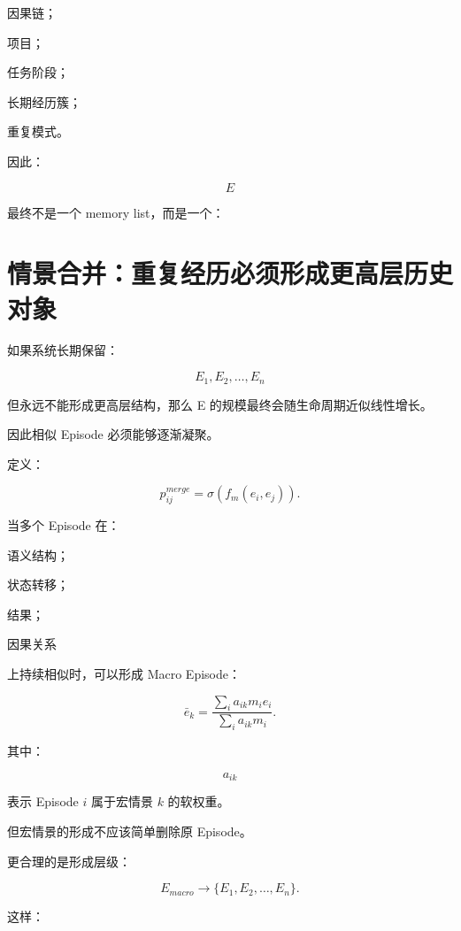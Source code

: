 因果链；

项目；

任务阶段；

长期经历簇；

重复模式。

因此：

\[
\boxed{
E
}
\]

最终不是一个 memory list，而是一个：

\begin{statementbox}
\centering
{}
\end{statementbox}


\section{情景合并：重复经历必须形成更高层历史对象}

如果系统长期保留：

\[
E_1,E_2,\ldots,E_n
\]

但永远不能形成更高层结构，那么 E 的规模最终会随生命周期近似线性增长。

因此相似 Episode 必须能够逐渐凝聚。

定义：

\[
p_{ij}^{merge}
=
\sigma
\left(
f_m(e_i,e_j)
\right).
\]

当多个 Episode 在：

语义结构；

状态转移；

结果；

因果关系

上持续相似时，可以形成 Macro Episode：

\[
\boxed{
\bar e_k
=
\frac{
\sum_i a_{ik}m_ie_i
}{
\sum_i a_{ik}m_i
}.
}
\]

其中：

\[
a_{ik}
\]

表示 Episode \(i\) 属于宏情景 \(k\) 的软权重。

但宏情景的形成不应该简单删除原 Episode。

更合理的是形成层级：

\[
\boxed{
E_{macro}
\rightarrow
\{
E_1,E_2,\ldots,E_n
\}.
}
\]

这样：

\begin{statementbox}
\centering
{}
\end{statementbox}

